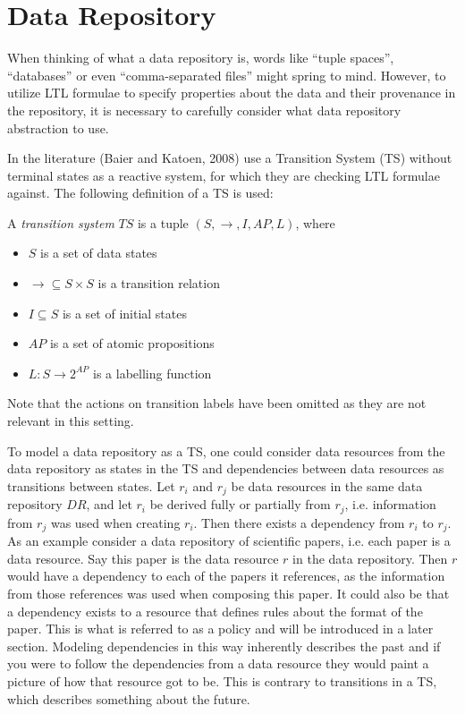 \section{Data Repository}\label{sec:data-repository}
When thinking of what a data repository is, words like ``tuple spaces'', ``databases'' or even ``comma-separated files'' might spring to mind. However, to utilize LTL formulae to specify properties about the data and their provenance in the repository, it is necessary to carefully consider what data repository abstraction to use. 

In the literature (Baier and Katoen, 2008)\cite{baier2008principles} use a Transition System (TS) without terminal states as a reactive system, for which they are checking LTL formulae against. The following definition of a TS is used:
\begin{definition}\label{def:ts}
A \emph{transition system} $TS$ is a tuple $\left(S, \longrightarrow, I, AP, L \right)$, where
\begin{itemize}
  \item $S$ is a set of data states
  \item $\longrightarrow \subseteq S \times S$ is a transition relation
  \item $I \subseteq S$ is a set of initial states
  \item $AP$ is a set of atomic propositions
  \item $L : S \rightarrow 2^{AP}$ is a labelling function
\end{itemize}
Note that the actions on transition labels have been omitted as they are not relevant in this setting.
\end{definition}

To model a data repository as a TS, one could consider data resources from the data repository as states in the TS and dependencies between data resources as transitions between states. Let $r_i$ and $r_j$ be data resources in the same data repository $DR$, and let $r_i$ be derived fully or partially from $r_j$, i.e. information from $r_j$ was used when creating $r_i$. Then there exists a dependency from $r_i$ to $r_j$. As an example consider a data repository of scientific papers, i.e. each paper is a data resource. Say this paper is the data resource $r$ in the data repository. Then $r$ would have a dependency to each of the papers it references, as the information from those references was used when composing this paper. It could also be that a dependency exists to a resource that defines rules about the format of the paper. This is what is referred to as a policy and will be introduced in a later section. Modeling dependencies in this way inherently describes the past and if you were to follow the dependencies from a data resource they would paint a picture of how that resource got to be. This is contrary to transitions in a TS, which describes something about the future.

